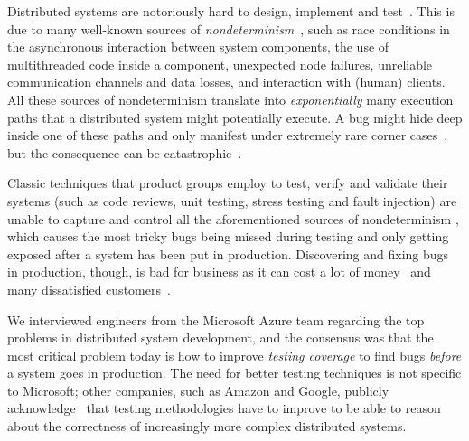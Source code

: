 Distributed systems are notoriously hard to design, implement and test~\cite{cavage2013there, laguna2015debugging, maddox2015test}. This is due to many well-known sources of \emph{nondeterminism}~\cite{chandra2007paxos}, such as race conditions in the asynchronous interaction between system components, the use of multithreaded code inside a component, unexpected node failures, unreliable communication channels and data losses, and interaction with (human) clients.
%
All these sources of nondeterminism translate into \emph{exponentially} many execution paths that a distributed system might potentially execute. A bug might hide deep inside one of these paths and only manifest under extremely rare corner cases~\cite{gray1986computers, musuvathi2008finding}, but the consequence can be catastrophic~\cite{amazon2012aws, google2014outage}.

Classic techniques that product groups employ to test, verify and validate their systems (such as code reviews, unit testing, stress testing and fault injection) are unable to capture and control all the aforementioned sources of nondeterminism  , which causes the most tricky bugs being missed during testing and only getting exposed after a system has been put in production. Discovering and fixing bugs in production, though, is bad for business as it can cost a lot of money~\cite{tassey2002economic}  and many dissatisfied customers~\cite{amazon2012aws, google2014outage}.

We interviewed engineers from the Microsoft Azure team regarding the top problems in distributed system development, and the consensus was that the most critical problem today is how to improve \emph{testing coverage} to find bugs \emph{before} a system goes in production. The need for better testing techniques is not specific to Microsoft; other companies, such as Amazon and Google, publicly acknowledge~\cite{newcombe2015aws} that testing methodologies have to improve to be able to reason about the correctness of increasingly more complex distributed systems. 


